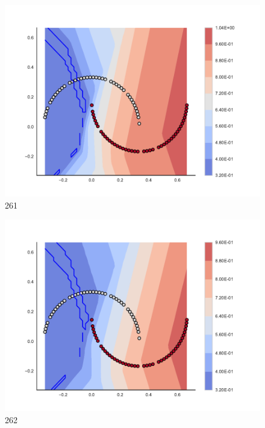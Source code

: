 \begin{subfigure}[b]{0.09\textwidth}
    \includegraphics[clip, trim=2.35cm 1.75cm 4.5cm 0cm,width=\textwidth]{img/convergence/261.pdf}
    \caption{261}
    \label{fig:convergence_261}
\end{subfigure}
%
\begin{subfigure}[b]{0.09\textwidth}
    \includegraphics[clip, trim=2.35cm 1.75cm 4.5cm 0cm,width=\textwidth]{img/convergence/262.pdf}
    \caption{262}
    \label{fig:convergence_262}
\end{subfigure}
%
